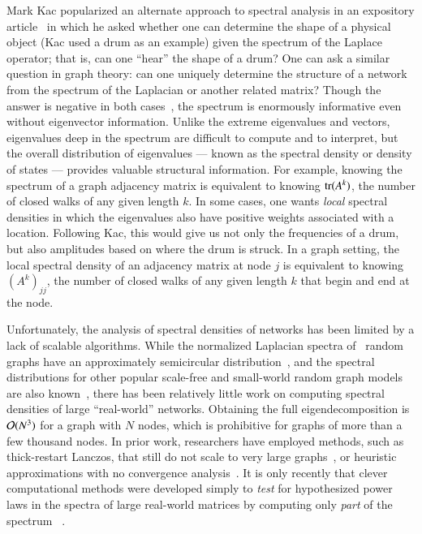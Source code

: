Mark Kac popularized an alternate approach to spectral analysis in an expository
article~\cite{kac1966hear} in which he asked whether one can determine the shape
of a physical object (Kac used a drum as an example) given the spectrum of the
Laplace operator; that is, can one ``hear'' the shape of a drum?  One can ask a
similar question in graph theory: can one uniquely determine the structure of a
network from the spectrum of the Laplacian or another related matrix?  Though
the answer is negative in both cases~\cite{gordon1992cannot,
ctekovic1998spectra}, the spectrum is enormously informative even without
eigenvector information.  Unlike the extreme eigenvalues and vectors,
eigenvalues deep in the spectrum are difficult to compute and to interpret, but
the overall distribution of eigenvalues --- known as the spectral density or
density of states --- provides valuable structural information.  For example,
knowing the spectrum of a graph adjacency matrix is equivalent to knowing
$\operatorname{tr}(A^k)$, the number of closed walks of any given length $k$. In some cases,
one wants {\em local} spectral densities in which the eigenvalues also have
positive weights associated with a location. Following Kac, this would give us
not only the frequencies of a drum, but also amplitudes based on where the drum
is struck.  In a graph setting, the local spectral density of an adjacency
matrix at node $j$ is equivalent to knowing $(A^k)_{jj}$, the number of closed
walks of any given length $k$ that begin and end at the node.

Unfortunately, the analysis of spectral densities of networks has been
limited by a lack of scalable algorithms.  While the normalized
Laplacian spectra of \ErdosRenyi\ random graphs have an approximately
semicircular distribution~\cite{wigner1958distribution}, and the spectral
distributions for other popular scale-free and small-world random graph models
are also known~\cite{farkas2001spectra}, there has been relatively little work
on computing spectral densities of large ``real-world'' networks. Obtaining the
full eigendecomposition is $\mathcal{O}(N^3)$ for a graph with $N$ nodes, which is
prohibitive for graphs of more than a few thousand nodes.  In prior work,
researchers have employed methods, such as thick-restart Lanczos, that still do
not scale to very large graphs~\cite{farkas2001spectra}, or heuristic
approximations with no convergence analysis~\cite{banerjee2008spectrum}. It is
only recently that clever computational methods were developed simply to 
\emph{test} for hypothesized power laws in the spectra of large real-world
matrices by computing only \emph{part} of the spectrum~
\cite{eikmeier2017revisiting}.

